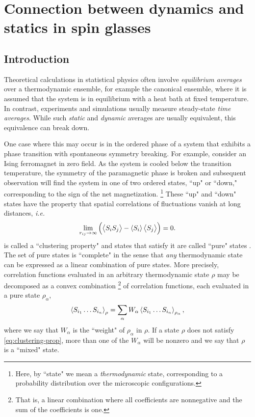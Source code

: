 \chapter{Connection between dynamics and statics in spin glasses}
\label{chap:connection}

\section{Introduction}
\label{sec:connection-intro}

Theoretical calculations in statistical physics often involve \emph{equilibrium
  averages} over a thermodynamic ensemble, for example the canonical ensemble,
where it is assumed that the system is in equilibrium with a heat bath at fixed
temperature. In contrast, experiments and simulations usually measure
steady-state \emph{time averages}. While such \emph{static} and \emph{dynamic}
averages are usually equivalent, this equivalence can break down.

One case where this may occur is in the ordered phase of a system that exhibits
a phase transition with spontaneous symmetry breaking. For example, consider an
Ising ferromagnet in zero field. As the system is cooled below the transition
temperature, the symmetry of the paramagnetic phase is broken and subsequent
observation will find the system in one of two ordered states, ``up" or
``down," corresponding to the sign of the net magnetization.%
\footnote{%
  Here, by ``state" we mean a \emph{thermodynamic} state, corresponding to a
  probability distribution over the microscopic configurations.
}
These ``up" and ``down" states have the property that spatial correlations of
fluctuations vanish at long distances, \textit{i.e.}
\begin{equation}
  \lim_{r_{ij} \to \infty} \left( \left< S_i S_j \right> - \left< S_i \right>\left< S_j \right> \right) = 0.
  \label{eq:clustering-prop}
\end{equation}
 is called a ``clustering property" and states that
satisfy it are called ``pure" states \autocite{newman2003ordering}. The set of
pure states is ``complete" in the sense that \emph{any} thermodynamic state can
be expressed as a linear combination of pure states. More precisely,
correlation functions evaluated in an arbitrary thermodynamic state $\rho$ may
be decomposed as a convex combination%
\footnote{%
  That is, a linear combination where all coefficients are nonnegative and the
  sum of the coefficients is one.
}
of correlation functions, each evaluated in a pure state $\rho_{\alpha}$,
\begin{equation}
  \left< S_{i_1} \dots S_{i_n} \right>_{\rho}
  = \sum_{\alpha} W_{\alpha} \left< S_{i_1} \dots S_{i_n} \right>_{\rho_{\alpha}},
\end{equation}
where we say that $W_{\alpha}$ is the ``weight" of $\rho_{\alpha}$ in $\rho$.
If a state $\rho$ does not satisfy \cref{eq:clustering-prop}, more than one of
the $W_{\alpha}$ will be nonzero and we say that $\rho$ is a ``mixed" state.

